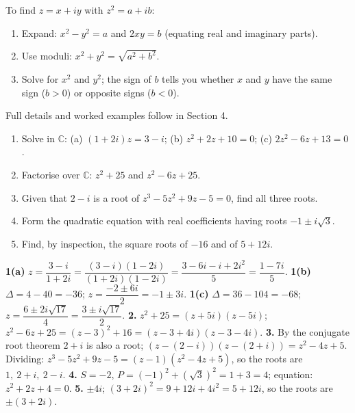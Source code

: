 \documentclass[11pt]{article}
\begin{document}
\begin{methode}
To find $z=x+iy$ with $z^2=a+ib$:
\begin{enumerate}
\item Expand: $x^2-y^2=a$ and $2xy=b$ (equating real and imaginary parts).
\item Use moduli: $x^2+y^2=\sqrt{a^2+b^2}$.
\item Solve for $x^2$ and $y^2$; the sign of $b$ tells you whether $x$ and $y$ have the same sign ($b>0$) or opposite signs ($b<0$).
\end{enumerate}
Full details and worked examples follow in Section 4.
\end{methode}

\begin{exercice}[Practice]
\begin{enumerate}
\item Solve in $\mathbb{C}$: (a) $(1+2i)z=3-i$; (b) $z^2+2z+10=0$; (c) $2z^2-6z+13=0$.
\item Factorise over $\mathbb{C}$: $z^2+25$ and $z^2-6z+25$.
\item Given that $2-i$ is a root of $z^3-5z^2+9z-5=0$, find all three roots.
\item Form the quadratic equation with real coefficients having roots $-1\pm i\sqrt{3}$.
\item Find, by inspection, the square roots of $-16$ and of $5+12i$.
\end{enumerate}
\end{exercice}

\begin{corrige}[Exercise 1]
\textbf{1(a)} $z=\dfrac{3-i}{1+2i}=\dfrac{(3-i)(1-2i)}{(1+2i)(1-2i)}=\dfrac{3-6i-i+2i^2}{5}=\dfrac{1-7i}{5}$.
\textbf{1(b)} $\Delta=4-40=-36$; $z=\dfrac{-2\pm 6i}{2}=-1\pm 3i$.
\textbf{1(c)} $\Delta=36-104=-68$; $z=\dfrac{6\pm 2i\sqrt{17}}{4}=\dfrac{3\pm i\sqrt{17}}{2}$.
\textbf{2.} $z^2+25=(z+5i)(z-5i)$; $z^2-6z+25=(z-3)^2+16=(z-3+4i)(z-3-4i)$.
\textbf{3.} By the conjugate root theorem $2+i$ is also a root; $(z-(2-i))(z-(2+i))=z^2-4z+5$. Dividing: $z^3-5z^2+9z-5=(z-1)(z^2-4z+5)$, so the roots are $1,\ 2+i,\ 2-i$.
\textbf{4.} $S=-2$, $P=(-1)^2+(\sqrt3)^2=1+3=4$; equation: $z^2+2z+4=0$.
\textbf{5.} $\pm 4i$; $(3+2i)^2=9+12i+4i^2=5+12i$, so the roots are $\pm(3+2i)$.
\end{corrige}
\end{document}
